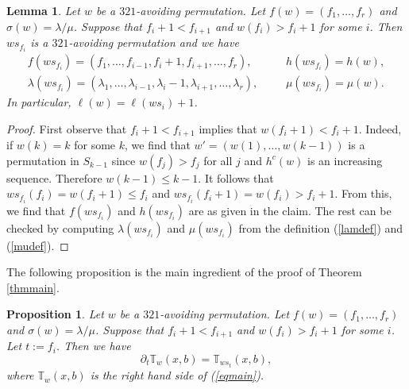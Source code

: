 \documentclass[11pt,reqno,sumlimits]{amsart}
\newcommand{\bbT}{{\mathbb T}}
\newtheorem{lem}[thm]{Lemma}
\newtheorem{prop}[thm]{Proposition}
\theoremstyle{definition}
\numberwithin{equation}{section}
\begin{document}
\begin{lem}\label{lemtabkey}
Let $w$ be a $321$-avoiding permutation. Let $f(w)=(f_1,\dots, f_r)$ and $\sigma(w)=\lambda/\mu$. Suppose that $f_i+1<f_{i+1}$ and $w(f_i)>f_i+1$ for some $i$. 
Then $ws_{f_i}$ is a $321$-avoiding permutation and we have
\begin{eqnarray*}
f(ws_{f_i})=(f_1,\dots, f_{i-1}, f_i+1, f_{i+1},\dots, f_r), \ && \ \ \ \ h(ws_{f_i})= h(w),\\
\lambda(ws_{f_i})= (\lambda_1,\dots, \lambda_{i-1},\lambda_{i}-1,\lambda_{i+1},\dots, \lambda_r), && \ \ \ \ \mu(ws_{f_i})=\mu(w).
\end{eqnarray*}
 In particular, $\ell(w)=\ell(ws_i)+1$.
\end{lem}
\begin{proof}
First observe that $f_i+1<f_{i+1}$ implies that $w(f_i+1) < f_i+1$. Indeed, if $w(k)=k$ for some $k$, we find that $w'=(w(1),\dots, w(k-1))$ is a permutation in $S_{k-1}$ since $w(f_j)>f_j$ for all $j$ and $h^c(w)$ is an increasing sequence.  Therefore $w(k-1)\leq k-1$. It follows that $w s_{f_i}(f_i) = w(f_i + 1) \leq f_i$ and $ws_{f_i}(f_i+1) = w(f_i)>f_i+1$. From this, we find that $f(ws_{f_i})$ and $h(ws_{f_i})$ are as given in the claim. The rest can be checked by computing $\lambda(ws_{f_i})$ and $\mu(ws_{f_i})$ from the definition (\ref{lamdef}) and (\ref{mudef}).
\end{proof}
The following proposition is the main ingredient of the proof of Theorem \ref{thmmain}.
\begin{prop}\label{propmain}
Let $w$ be a $321$-avoiding permutation. Let $f(w)=(f_1,\dots, f_r)$ and $\sigma(w)=\lambda/\mu$. Suppose that $f_i+1<f_{i+1}$ and $w(f_i)>f_i+1$ for some $i$. 
Let $t:=f_i$. Then we have
\[
\partial_{t} \bbT_w(x,b) = \bbT_{ws_t}(x,b),
\]
where $\bbT_w(x,b)$ is the right hand side of (\ref{eqmain}).
\end{prop}
\end{document}

